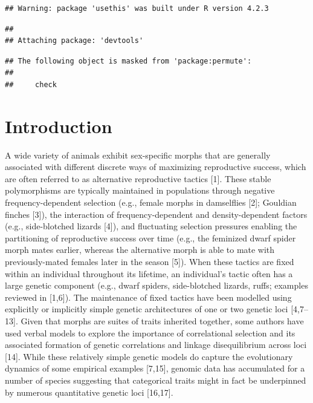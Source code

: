 \documentclass[
  11pt,
  a4paper,
]{article}
\begin{document}
\begin{verbatim}
## Warning: package 'usethis' was built under R version 4.2.3
\end{verbatim}

\begin{verbatim}
## 
## Attaching package: 'devtools'
\end{verbatim}

\begin{verbatim}
## The following object is masked from 'package:permute':
## 
##     check
\end{verbatim}

\hypertarget{introduction}{%
\section{Introduction}\label{introduction}}

A wide variety of animals exhibit sex-specific morphs that are generally
associated with different discrete ways of maximizing reproductive
success, which are often referred to as alternative reproductive tactics
{[}1{]}. These stable
polymorphisms are typically maintained in populations through negative
frequency-dependent selection (e.g., female morphs in damselflies
{[}2{]}; Gouldian finches
{[}3{]}), the interaction
of frequency-dependent and density-dependent factors (e.g.,
side-blotched lizards {[}4{]}), and fluctuating
selection pressures enabling the partitioning of reproductive success
over time (e.g., the feminized dwarf spider morph mates earlier, whereas
the alternative morph is able to mate with previously-mated females
later in the season {[}5{]}).
When these tactics are fixed within an individual throughout its
lifetime, an individual's tactic often has a large genetic component
(e.g., dwarf spiders, side-blotched lizards, ruffs; examples reviewed in
{[}1,6{]}). The maintenance of fixed tactics
have been modelled using explicitly or implicitly simple genetic
architectures of one or two genetic loci
{[}4,7--13{]}. Given that morphs are suites of
traits inherited together, some authors have used verbal models to
explore the importance of correlational selection and its associated
formation of genetic correlations and linkage disequilibrium across loci
{[}14{]}. While these relatively
simple genetic models do capture the evolutionary dynamics of some
empirical examples {[}7,15{]}, genomic data has accumulated
for a number of species suggesting that categorical traits might in fact
be underpinned by numerous quantitative genetic loci
{[}16,17{]}.
\end{document}
